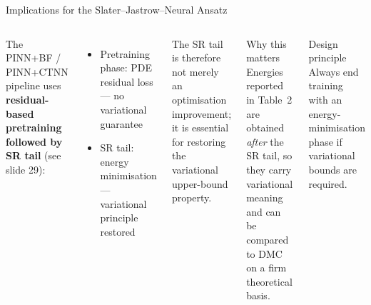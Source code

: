 \documentclass[aspectratio=169,10pt]{beamer}
\begin{document}
\begin{frame}{Implications for the Slater--Jastrow--Neural Ansatz}
  \begin{columns}[T]
      The PINN+BF / PINN+CTNN pipeline uses
      \textbf{residual-based pretraining followed by SR tail}
      (see slide 29):
      \begin{itemize}
        \item Pretraining phase: PDE residual loss —
              \alert{no variational guarantee}
        \item SR tail: energy minimisation —
              \alert{variational principle restored}
      \end{itemize}
      \vspace{0.2cm}
      The SR tail is therefore not merely an optimisation improvement;
      it is essential for restoring the variational upper-bound property.
      \begin{block}{Why this matters}
        Energies reported in Table~2 are obtained \emph{after} the SR
        tail, so they carry variational meaning and can be compared to
        DMC on a firm theoretical basis.
      \end{block}
      \vspace{0.2cm}
      \begin{alertblock}{Design principle}
        Always end training with an energy-minimisation phase if
        variational bounds are required.
      \end{alertblock}
  \end{columns}
\end{frame}
\end{document}
